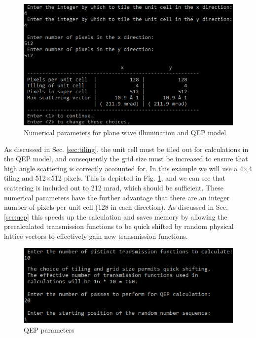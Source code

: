 \documentclass[12pt,a4paper]{article}
\newcommand{\by}{$\times$}
\begin{document}
\begin{figure}[!h]
\begin{center}
    \includegraphics[scale=0.75]{figures/pw_qep_numerical.png}
\caption{Numerical parameters for plane wave illumination and QEP model}
\label{fig:pw_qep_numerical}
\end{center}
\end{figure}

As discussed in Sec. \ref{sec:tiling}, the unit cell must be tiled out for calculations in the QEP model, and consequently the grid size must be increased to ensure that high angle scattering is correctly accounted for.
In this example we will use a 4\by4 tiling and 512\by512 pixels.
This is depicted in Fig. \ref{fig:pw_qep_numerical}, and we can see that scattering is included out to 212 mrad, which should be sufficient.
These numerical parameters have the further advantage that there are an integer number of pixels per unit cell (128 in each direction).
As discussed in Sec. \ref{sec:qep} this speeds up the calculation and saves memory by allowing the precalculated transmission functions to be quick shifted by random physical lattice vectors to effectively gain new transmission functions.

\begin{figure}[!h]
\begin{center}
    \includegraphics[scale=0.75]{figures/pw_qep_qep_questions.png}
\caption{QEP parameters}
\label{fig:pw_qep_qep_questions}
\end{center}
\end{figure}
\end{document}
